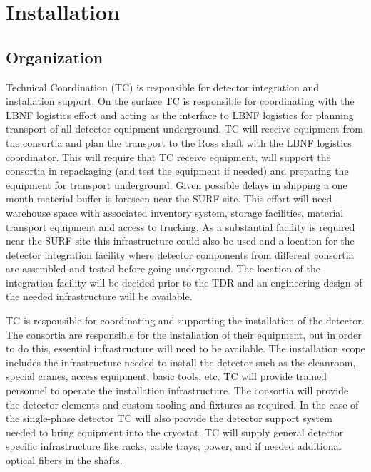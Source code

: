 \section{Installation}
\label{sec:fdsp-coord-install}

\subsection{Organization}
\label{sec:fdsp-coord-org}

Technical Coordination (TC) is responsible for detector
integration and installation support. On the surface TC is responsible for coordinating with
the LBNF logistics effort and acting as the interface to LBNF
logistics for planning transport of all detector equipment underground. TC
will receive equipment from the consortia and plan the transport to the
Ross shaft with the LBNF logistics coordinator. This will require that
TC receive equipment, will support the consortia in repackaging (and
test the equipment if needed) and preparing the equipment for
transport underground. Given possible delays in shipping a
one month material buffer is foreseen near the SURF site. This effort
will need warehouse space with associated inventory system, storage
facilities, material transport equipment and access to trucking. As a
substantial facility is required near the SURF site this
infrastructure could also be used and a location for the detector
integration facility where detector components from different
consortia are assembled and tested before going underground. The
location of the integration facility will be decided prior to the TDR
and an engineering design of the needed infrastructure will be
available.

TC is responsible for coordinating and supporting the installation of
the detector. The consortia are responsible for the installation of
their equipment, but in order to do this, essential infrastructure
will need to be available. The installation scope includes the
infrastructure needed to install the detector such as the cleanroom,
special cranes, access equipment, basic tools, etc. TC will provide
trained personnel to operate the installation infrastructure. The
consortia will provide the detector elements and custom tooling and
fixtures as required. In the case of the single-phase detector TC will
also provide the detector support system 
needed to bring equipment into the cryostat. TC will supply general
detector specific infrastructure like racks, cable trays, power, and
if needed additional optical fibers in the shafts.


